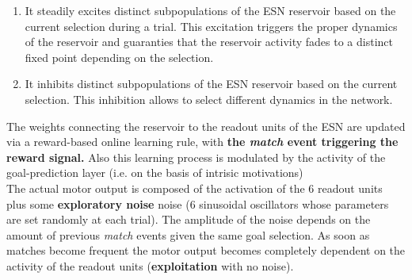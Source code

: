 \documentclass[11pt]{article}
\begin{document}
\begin{enumerate}

    \item It steadily excites distinct subpopulations of the ESN
        reservoir based on the current selection during a trial. This
        excitation triggers the proper dynamics of the reservoir and
        guaranties that the reservoir activity fades to a distinct fixed
        point depending on the selection.

    \item It inhibits distinct subpopulations of the ESN reservoir based on
        the current selection. This inhibition allows to select different
        dynamics in the network.

\end{enumerate}

The weights connecting the reservoir to the readout units of the ESN are
updated via a reward-based online learning rule, with \textbf{the \emph{match}
event triggering the reward signal.} Also this learning
process is modulated by the activity of the goal-prediction
layer (i.e. on the basis of intrisic motivations)\\

The actual motor output is composed of the activation of the
6 readout units plus some \textbf{exploratory noise} noise
(6 sinusoidal oscillators whose parameters are set randomly
at each trial). The amplitude of the noise depends on the
amount of previous \emph{match} events given the same goal
selection.  As soon as matches become frequent the motor
output becomes completely dependent on the activity of the
readout units (\textbf{exploitation} with no noise). 
\end{document}
